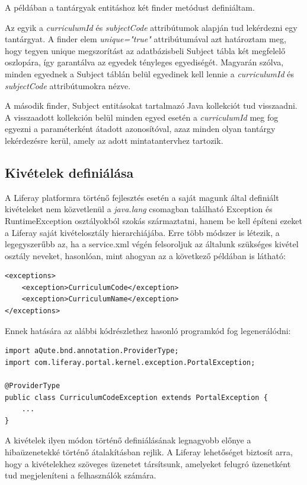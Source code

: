 \documentclass[hidelinks, 12pt, a4paper]{report}
\begin{document}
A példában a tantárgyak entitáshoz két finder metódust definiáltam.

Az egyik a \emph{curriculumId} és \emph{subjectCode} attribútumok alapján tud lekérdezni egy tantárgyat. A finder elem \emph{unique="true"} attribútumával azt határoztam meg, hogy tegyen unique megszorítást az adatbázisbeli Subject tábla két megfelelő oszlopára, így garantálva az egyedek tényleges egyediségét. Magyarán szólva, minden egyednek a Subject táblán belül egyedinek kell lennie a \emph{curriculumId} és \emph{subjectCode} attribútumokra nézve.

A második finder, Subject entitásokat tartalmazó Java kollekciót tud visszaadni. A visszaadott kollekción belül minden egyed esetén a \emph{curriculumId} meg fog egyezni a paraméterként átadott azonosítóval, azaz minden olyan tantárgy lekérdezésre kerül, amely az adott mintatantervhez tartozik.

\subsection{Kivételek definiálása}

A Liferay platformra történő fejlesztés esetén a saját magunk által definiált kivételeket nem közvetlenül a \emph{java.lang} csomagban található Exception és RuntimeException osztályokból szokás származtatni, hanem be kell építeni ezeket a Liferay saját kivételosztály hierarchiájába. Erre több módszer is létezik, a legegyszerűbb az, ha a service.xml végén felsoroljuk az általunk szükséges kivétel osztály neveket, hasonlóan, mint ahogyan az a következő példában is látható:

\begin{lstlisting}[style=customxml]
<exceptions>
	<exception>CurriculumCode</exception>
	<exception>CurriculumName</exception>
</exceptions>
\end{lstlisting}

Ennek hatására az alábbi kódrészlethez hasonló programkód fog legenerálódni:

\begin{lstlisting}[style=customjava]
import aQute.bnd.annotation.ProviderType;
import com.liferay.portal.kernel.exception.PortalException;

@ProviderType
public class CurriculumCodeException extends PortalException {
	...
}
\end{lstlisting}

A kivételek ilyen módon történő definiálásának legnagyobb előnye a hibaüzenetekké történő átalakításban rejlik. A Liferay lehetőséget biztosít arra, hogy a kivételekhez szöveges üzenetet társítsunk, amelyeket felugró üzenetként tud megjeleníteni a felhasználók számára.
\end{document}
